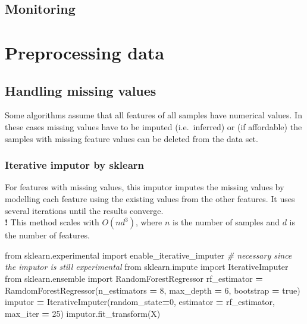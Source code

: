 \documentclass[
]{book}
\newenvironment{Shaded}{\begin{snugshade}}{\end{snugshade}}
\newcommand{\CommentTok}[1]{\textcolor[rgb]{0.56,0.35,0.01}{\textit{#1}}}
\newcommand{\DecValTok}[1]{\textcolor[rgb]{0.00,0.00,0.81}{#1}}
\newcommand{\ImportTok}[1]{#1}
\newcommand{\NormalTok}[1]{#1}
\newcommand{\OperatorTok}[1]{\textcolor[rgb]{0.81,0.36,0.00}{\textbf{#1}}}
\begin{document}
\hypertarget{monitoring}{%
\subsection{Monitoring}\label{monitoring}}

\hypertarget{preprocessing-data}{%
\section{Preprocessing data}\label{preprocessing-data}}

\hypertarget{handling-missing-values}{%
\subsection{Handling missing values}\label{handling-missing-values}}

Some algorithms assume that all features of all samples have numerical
values. In these cases missing values have to be imputed (i.e.~inferred)
or (if affordable) the samples with missing feature values can be
deleted from the data set.

\hypertarget{iterative-imputor-by-sklearn}{%
\subsubsection{Iterative imputor by sklearn}\label{iterative-imputor-by-sklearn}}

For features with missing values, this imputor imputes the missing
values by modelling each feature using the existing values from the
other features. It uses several iterations until the results converge.\\
\textbf{!} This method scales with \(O(nd^3)\), where \(n\) is the number of
samples and \(d\) is the number of features.

\begin{Shaded}
\begin{Highlighting}[]
\ImportTok{from}\NormalTok{ sklearn.experimental }\ImportTok{import}\NormalTok{ enable\_iterative\_imputer }\CommentTok{\# necessary since the imputor is still experimental}
\ImportTok{from}\NormalTok{ sklearn.impute }\ImportTok{import}\NormalTok{ IterativeImputer}
\ImportTok{from}\NormalTok{ sklearn.ensemble }\ImportTok{import}\NormalTok{ RandomForestRegressor }
\NormalTok{rf\_estimator }\OperatorTok{=}\NormalTok{ RamdomForestRegressor(n\_estimators }\OperatorTok{=} \DecValTok{8}\NormalTok{, max\_depth }\OperatorTok{=} \DecValTok{6}\NormalTok{, bootstrap }\OperatorTok{=}\NormalTok{ true)}
\NormalTok{imputor }\OperatorTok{=}\NormalTok{ IterativeImputer(random\_state}\OperatorTok{=}\DecValTok{0}\NormalTok{, estimator }\OperatorTok{=}\NormalTok{ rf\_estimator, max\_iter }\OperatorTok{=} \DecValTok{25}\NormalTok{)}
\NormalTok{imputor.fit\_transform(X)}
\end{Highlighting}
\end{Shaded}
\end{document}
